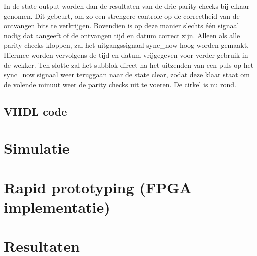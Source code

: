 \noindent In de state output worden dan de resultaten van de drie parity checks bij elkaar genomen. Dit gebeurt, om zo een strengere controle op de correctheid van de ontvangen bits te verkrijgen. Bovendien is op deze manier slechts \'e\'en signaal nodig dat aangeeft of de ontvangen tijd en datum correct zijn. Alleen als alle parity checks kloppen, zal het uitgangssignaal sync\_now hoog worden gemaakt. Hiermee worden vervolgens de tijd en datum vrijgegeven voor verder gebruik in de wekker. Ten slotte zal het subblok direct na het uitzenden van een puls op het sync\_now signaal weer teruggaan naar de state clear, zodat deze klaar staat om de volende minuut weer de parity checks uit te voeren. De cirkel is nu rond.

\subsection{VHDL code}

\section{Simulatie}

\section{Rapid prototyping (FPGA implementatie)}

\section{Resultaten}
